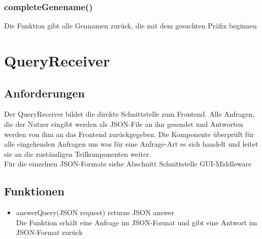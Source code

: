 \documentclass[]{article}
\begin{document}
%

\subsubsection{completeGenename()}
Die Funktion gibt alle Gennamen zurück, die mit dem gesuchten Präfix beginnen\\
\newpage
\section{QueryReceiver}
\subsection{Anforderungen}
Der QueryReceiver bildet die direkte Schnittstelle zum Frontend. Alle Anfragen, die der Nutzer eingibt werden als JSON-File an ihn gesendet und Antworten werden von ihm an das Frontend zurückgegeben. Die Komponente überprüft für alle eingehenden Anfragen um was für eine Anfrage-Art es sich handelt und leitet sie an die zuständigen Teilkomponenten weiter.\\
Für die einzelnen JSON-Formate siehe Abschnitt Schnittstelle GUI-Middleware\\

\subsection{Funktionen}
\begin{itemize}
\item answerQuery(JSON request) returns JSON answer\\
Die Funktion erhält eine Anfrage im JSON-Format und gibt eine Antwort im JSON-Format zurück
\end{itemize}
\end{document}
